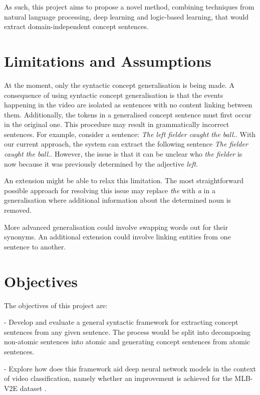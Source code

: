 As such, this project aims to propose a novel method, combining techniques from natural language processing, deep learning and logic-based learning, that would extract domain-independent concept sentences.


\section{Limitations and Assumptions}

At the moment, only the syntactic concept generalisation is being made. 
A consequence of using syntactic concept generalisation is that the events happening in the video are isolated as sentences with no content linking between them. 
Additionally, the tokens in a generalised concept sentence must first occur in the original one.
This procedure may result in grammatically incorrect sentences.
For example, consider a sentence: \emph{The left fielder caught the ball.}.
With our current approach, the system can extract the following sentence \emph{The fielder caught the ball.}.
However, the issue is that it can be unclear who \emph{the fielder} is now because it was previously determined by the adjective \emph{left}.

An extension might be able to relax this limitation.
The most straightforward possible approach for resolving this issue may replace \emph{the} with \emph{a} in a generalisation where additional information about the determined noun is removed.

More advanced generalisation could involve swapping words out for their synonyms.
An additional extension could involve linking entities from one sentence to another. 



\section{Objectives}

The objectives of this project are:

 - Develop and evaluate a general syntactic framework for extracting concept sentences from any given sentence. The process would be split into decomposing non-atomic sentences into atomic and generating concept sentences from atomic sentences.
 
 - Explore how does this framework aid deep neural network models in the context of video classification, namely whether an improvement is achieved for the MLB-V2E dataset \cite{RefWorks:RefID:16-2021automatic}.


